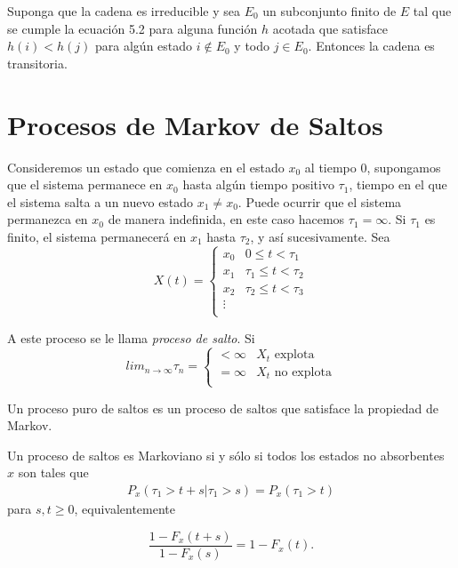 \begin{Prop}\label{Prop.5.4}
Suponga que la cadena es irreducible y sea $E_{0}$ un subconjunto finito de $E$ tal que se cumple la ecuaci\'on 5.2 para alguna funci\'on $h$ acotada que satisface $h\left(i\right)<h\left(j\right)$ para alg\'un estado $i\notin E_{0}$ y todo $j\in E_{0}$. Entonces la cadena es transitoria.
\end{Prop}

%
\section{Procesos de Markov de Saltos}
%


Consideremos un estado que comienza en el estado $x_{0}$ al tiempo $0$, supongamos que el sistema permanece en $x_{0}$ hasta alg\'un tiempo positivo $\tau_{1}$, tiempo en el que el sistema salta a un nuevo estado $x_{1}\neq x_{0}$. Puede ocurrir que el sistema permanezca en $x_{0}$ de manera indefinida, en este caso hacemos $\tau_{1}=\infty$. Si $\tau_{1}$ es finito, el sistema permanecer\'a en $x_{1}$ hasta $\tau_{2}$, y as\'i sucesivamente.
Sea
\begin{equation}
X\left(t\right)=\left\{\begin{array}{cc}
x_{0} & 0\leq t<\tau_{1}\\
x_{1} & \tau_{1}\leq t<\tau_{2}\\
x_{2} & \tau_{2}\leq t<\tau_{3}\\
\vdots &\\
\end{array}\right.
\end{equation}

A este proceso  se le llama {\em proceso de salto}. Si
\begin{equation}
lim_{n\rightarrow\infty}\tau_{n}=\left\{\begin{array}{cc}
<\infty & X_{t}\textrm{ explota}\\
=\infty & X_{t}\textrm{ no explota}\\
\end{array}\right.
\end{equation}

Un proceso puro de saltos es un proceso de saltos que satisface la propiedad de Markov.

\begin{Prop}
Un proceso de saltos es Markoviano si y s\'olo si todos los estados no absorbentes $x$ son tales que
\begin{eqnarray*}
P_{x}\left(\tau_{1}>t+s|\tau_{1}>s\right)=P_{x}\left(\tau_{1}>t\right)
\end{eqnarray*}
para $s,t\geq0$, equivalentemente

\begin{equation}\label{Eq.5}
\frac{1-F_{x}\left(t+s\right)}{1-F_{x}\left(s\right)}=1-F_{x}\left(t\right).
\end{equation}
\end{Prop}

